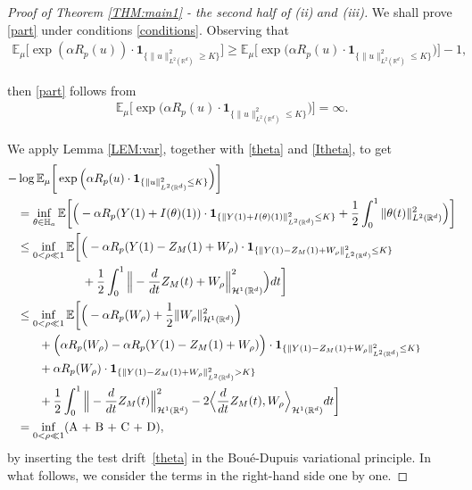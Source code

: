 \documentclass[%
11pt,  reqno]{amsart}
\theoremstyle{remarkstyle}
\newcommand{\1}{\hspace{0.2mm}\text{I}\hspace{0.2mm}}
\newcommand{\noi}{\noindent}
\newcommand{\R}{\mathbb{R}}
\newcommand{\E}{\mathbb{E}}
\newcommand{\al}{\alpha}
\newcommand{\ind}{\mathbf 1}
\renewcommand{\H}{\mathcal{H}}
\numberwithin{equation}{section}
\numberwithin{theorem}{section}
\begin{document}
	\begin{proof}[Proof of Theorem \ref{THM:main1} - the second half of \textup{(ii) $and$ (iii)}]
		We shall prove \eqref{part} under conditions \eqref{conditions}.
		Observing that
		\begin{align*}
			\E_{\mu}  \Big[ \exp (\al R_p(u)) \cdot  \ind_{\{\|u\|^2_{L^2(\R^d)}\ge K\}}\Big]
			\ge \E_{\mu}  \Big[ \exp \Big(\al R_p(u) \cdot  \ind_{\{\|u\|^2_{L^2(\R^d)}\le K\}} \Big)\Big] - 1,
		\end{align*}
		
		\noi
		then \eqref{part} follows from
		\begin{align}
			\label{var10}
			\E_{\mu}  \bigg[ \exp \Big(\al R_p(u) \cdot  \ind_{\{\|u\|^2_{L^2(\R^d)}\le K\}} \Big)\bigg] = \infty.
		\end{align}
		
		We apply Lemma \ref{LEM:var}, together with \eqref{theta}  
		and \eqref{Itheta}, to get 
		\begin{align}
			\label{var13}
			\begin{split}
				- & \log  \E_{\mu}  \bigg[ \exp \Big(\al R_p (u) \cdot  \ind_{\{\|u\|^2_{L^2(\R^d)}\le K\}} \Big)\bigg]\\
				& = \inf_{\theta \in \mathbb H_a} \E \bigg[ \Big( - \al R_p (Y(1) + I (\theta) (1))  \cdot \ind_{\{\|Y(1) + I (\theta) (1)\|^2_{L^2 (\R^d)}\le K\}} + \frac12 \int_0^1 \| \theta (t)\|_{L^2 (\R^d)}^2\Big)    \bigg] \\
				&   \le \inf_{0 < \rho \ll 1} \E \bigg[ \Big( - \al R_p ( Y(1) - Z_M (1) + W_\rho )  \cdot \ind_{\{\| Y(1) - Z_M (1) + W_\rho \|^2_{L^2 (\R^d)}\le K\}}\\
				& \hphantom{XXXXXX}
				+ \frac12 \int_0^1 \Big\| -  \frac{d}{dt} Z_M (t) +    W_\rho \Big\|_{\H^1  (\R^d)}^2\Big) dt   \bigg]\\
				& \le \inf_{0 < \rho \ll 1} \E \bigg[ 
				\Big(- \al R_p (W_\rho) + \frac12 \| W_\rho\|_{\H^1  (\R^d)}^2 \Big)\\ 
				& \hphantom{XX}+  \Big( \al R_p ( W_\rho) - \al R_p  ( Y(1) - Z_M (1) + W_\rho ) \Big)  \cdot \ind_{\{\| Y(1) - Z_M (1) + W_\rho \|^2_{L^2 (\R^d)}\le K\}}\\
				& \hphantom{XX} + \al R_p(  W_\rho) \cdot \ind_{\{\| Y(1) - Z_M (1) + W_\rho \|^2_{L^2 (\R^d)} > K\}} \\
				& \hphantom{XX}
				+ \frac12 \int_0^1 \Big\| -  \frac{d}{dt} Z_M (t) \Big\|_{\H^1  (\R^d)}^2 - 2 \Big\langle   \frac{d}{dt} Z_M (t) ,   W_\rho \Big\rangle_{\H^1 (\R^d)}  dt   \bigg] \\
				& = \inf_{0 < \rho \ll 1} ( \textup{A + B  + C + D}),
			\end{split}
		\end{align}
		by inserting the test drift~\eqref{theta} in the Bou\'e-Dupuis variational principle. In what follows, we consider the terms in the right-hand side one by one.
		

\end{proof}
\end{document}
